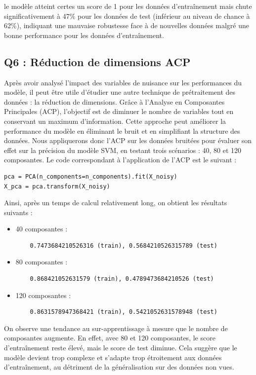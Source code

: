\documentclass{scrartcl}
\begin{document}
le modèle atteint certes un score de 1 pour les données d'entraînement mais chute significativement à 47\% pour les données de test (inférieur au niveau de chance à 62\%), indiquant une mauvaise robustesse face à de nouvelles données malgré une bonne performance pour les données d'entraînement.

\subsection{Q6 : Réduction de dimensions ACP}
\hspace{7pt} Après avoir analysé l'impact des variables de nuisance sur les performances du modèle, il peut être utile d'étudier une autre technique de prétraitement des données : la réduction de dimensions. Grâce à l'Analyse en Composantes Principales (ACP), l'objectif est de diminuer le nombre de variables tout en conservant un maximum d'information. Cette approche peut améliorer la performance du modèle en éliminant le bruit et en simplifiant la structure des données. Nous appliquerons donc l'ACP sur les données bruitées pour évaluer son effet sur la précision du modèle SVM, en testant trois scénarios : 40, 80 et 120 composantes. Le code correspondant à l'application de l'ACP est le suivant :
\begin{lstlisting}
pca = PCA(n_components=n_components).fit(X_noisy)
X_pca = pca.transform(X_noisy)
\end{lstlisting}

Ainsi, après un temps de calcul relativement long, on obtient les résultats suivants :
\begin{itemize}
    \item 40 composantes : 
    \begin{lstlisting}
    0.7473684210526316 (train), 0.5684210526315789 (test) 
    \end{lstlisting}
    \item 80 composantes :
    \begin{lstlisting}
    0.868421052631579 (train), 0.4789473684210526 (test) 
    \end{lstlisting}
    \item 120 composantes : 
    \begin{lstlisting}
    0.8631578947368421 (train), 0.5421052631578948 (test) 
    \end{lstlisting}
\end{itemize}

On observe une tendance au sur-apprentissage à mesure que le nombre de composantes augmente. En effet, avec 80 et 120 composantes, le score d'entraînement reste élevé, mais le score de test diminue. Cela suggère que le modèle devient trop complexe et s'adapte trop étroitement aux données d'entraînement, au détriment de la généralisation sur des données non vues.
\newline
\end{document}
